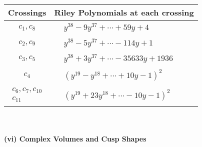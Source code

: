 \documentclass[1p]{elsarticle_modified}
\theoremstyle{definition}
\begin{document}
\begin{tabular}{m{50pt}|m{274pt}}
Crossings & \hspace{64pt}Riley Polynomials at each crossing \\
\hline $$\begin{aligned}c_{1},c_{8}\end{aligned}$$&$\begin{aligned}
&y^{38}-9 y^{37}+\cdots+59 y+4
\end{aligned}$\\
\hline $$\begin{aligned}c_{2},c_{9}\end{aligned}$$&$\begin{aligned}
&y^{38}-5 y^{37}+\cdots-114 y+1
\end{aligned}$\\
\hline $$\begin{aligned}c_{3},c_{5}\end{aligned}$$&$\begin{aligned}
&y^{38}+3 y^{37}+\cdots-35633 y+1936
\end{aligned}$\\
\hline $$\begin{aligned}c_{4}\end{aligned}$$&$\begin{aligned}
&(y^{19}- y^{18}+\cdots+10 y-1)^{2}
\end{aligned}$\\
\hline $$\begin{aligned}c_{6},c_{7},c_{10}\\c_{11}\end{aligned}$$&$\begin{aligned}
&(y^{19}+23 y^{18}+\cdots-10 y-1)^{2}
\end{aligned}$\\
\hline
\end{tabular}\\~\\
\newpage\flushleft \textbf{(vi) Complex Volumes and Cusp Shapes}
\end{document}
